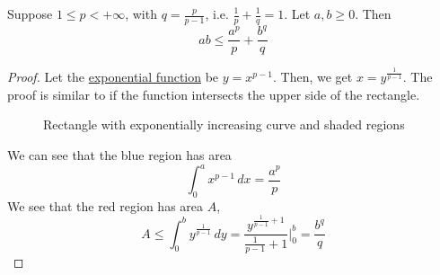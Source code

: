   \begin{theorem}
    \label{thm:youngs-inequality}
    Suppose $1 \leq p < +\infty$, with $q = \frac{p}{p-1}$, i.e. $\frac{1}{p} + \frac{1}{q} = 1$. Let $a, b \geq 0$. Then 
    \begin{equation}
      a b \leq \frac{a^p}{p} + \frac{b^q}{q} 
    \end{equation}
  \end{theorem}
  \begin{proof}
    Let the \hyperref[real-def:exponential-function]{exponential function} be $y = x^{p-1}$. Then, we get $x = y^{\frac{1}{p-1}}$. The proof is similar to if the function intersects the upper side of the rectangle. 

    \begin{figure}[H]
      \centering
      \caption{Rectangle with exponentially increasing curve and shaded regions}
      \label{fig:rectangle}
    \end{figure}

    We can see that the blue region has area 
    \begin{equation}
      \int_0^a x^{p-1} \,dx = \frac{a^p}{p} 
    \end{equation}
    We see that the red region has area $A$, 
    \begin{equation}
      A \leq \int_0^b y^{\frac{1}{p-1}} \,dy = \frac{y^{\frac{1}{p-1} + 1}}{\frac{1}{p-1} + 1} \bigg|_0^b = \frac{b^q}{q} 
    \end{equation}
  \end{proof}


